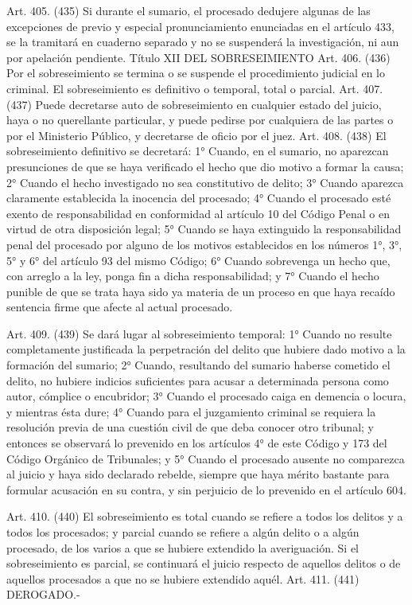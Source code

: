     Art. 405. (435) Si durante el sumario, el procesado dedujere algunas de las excepciones de previo y especial pronunciamiento enunciadas en el artículo 433, se la tramitará en cuaderno separado y no se suspenderá la investigación, ni aun por apelación pendiente.
    Título XII
    DEL SOBRESEIMIENTO
    Art. 406. (436) Por el sobreseimiento se termina o se suspende el procedimiento judicial en lo criminal.
    El sobreseimiento es definitivo o temporal, total o parcial.
    Art. 407. (437) Puede decretarse auto de sobreseimiento en cualquier estado del juicio, haya o no querellante particular, y puede pedirse por cualquiera de las partes o por el Ministerio Público, y decretarse de oficio por el juez.
    Art. 408. (438) El sobreseimiento definitivo se decretará:
    1° Cuando, en el sumario, no aparezcan presunciones de que se haya verificado el hecho que dio motivo a formar la causa;
    2° Cuando el hecho investigado no sea constitutivo de delito;
    3° Cuando aparezca claramente establecida la inocencia del procesado;
    4° Cuando el procesado esté exento de responsabilidad en conformidad al artículo 10 del Código Penal o en virtud de otra disposición legal;
    5° Cuando se haya extinguido la responsabilidad penal del procesado por alguno de los motivos establecidos en los números 1°, 3°, 5° y 6° del artículo 93 del mismo Código;
    6° Cuando sobrevenga un hecho que, con arreglo a la ley, ponga fin a dicha responsabilidad; y
    7° Cuando el hecho punible de que se trata haya sido ya materia de un proceso en que haya recaído sentencia firme que afecte al actual procesado.


    Art. 409. (439) Se dará lugar al sobreseimiento temporal:
    1° Cuando no resulte completamente justificada la perpetración del delito que hubiere dado motivo a la formación del sumario;
    2° Cuando, resultando del sumario haberse cometido el delito, no hubiere indicios suficientes para acusar a determinada persona como autor, cómplice o encubridor;
    3° Cuando el procesado caiga en demencia o locura, y mientras ésta dure;
    4° Cuando para el juzgamiento criminal se requiera la resolución previa de una cuestión civil de que deba conocer otro tribunal; y entonces se observará lo prevenido en los artículos 4° de este Código y 173 del Código Orgánico de Tribunales; y
    5° Cuando el procesado ausente no comparezca al juicio y haya sido declarado rebelde, siempre que haya mérito bastante para formular acusación en su contra, y sin perjuicio de lo prevenido en el artículo 604.


    Art. 410. (440) El sobreseimiento es total cuando se refiere a todos los delitos y a todos los procesados; y parcial cuando se refiere a algún delito o a algún procesado, de los varios a que se hubiere extendido la averiguación.
    Si el sobreseimiento es parcial, se continuará el juicio respecto de aquellos delitos o de aquellos procesados a que no se hubiere extendido aquél.
    Art. 411. (441) DEROGADO.-


